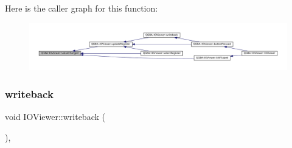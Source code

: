 Here is the caller graph for this function\+:
\nopagebreak
\begin{figure}[H]
\begin{center}
\leavevmode
\includegraphics[width=350pt]{class_q_g_b_a_1_1_i_o_viewer_a42edbfb2721d0c6e79e58da52d7d9844_icgraph}
\end{center}
\end{figure}
\mbox{\label{class_q_g_b_a_1_1_i_o_viewer_acff07815a227bbaa5b04fb85df8fa64a}} 
\subsubsection{\texorpdfstring{writeback}{writeback}}
{\footnotesize\ttfamily void I\+O\+Viewer\+::writeback (\begin{DoxyParamCaption}{ }\end{DoxyParamCaption})\hspace{0.3cm}{\ttfamily [private]}, {\ttfamily [slot]}}

